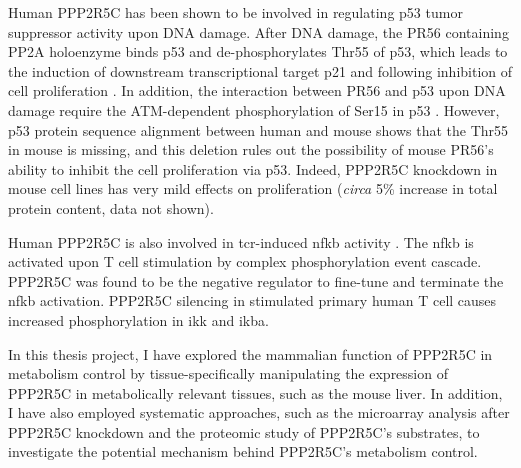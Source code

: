 Human PPP2R5C has been shown to be involved in regulating p53 tumor suppressor activity upon DNA damage\cite{li_specific_2007,shouse_serine_2008}. After DNA damage, the PR56\textgamma{} containing PP2A holoenzyme binds p53 and de-phosphorylates Thr55 of p53, which leads to the induction of downstream transcriptional target p21 and following inhibition of cell proliferation \cite{li_specific_2007}. In addition, the interaction between PR56\textgamma{} and p53 upon DNA damage require the ATM-dependent phosphorylation of Ser15 in p53 \cite{shouse_serine_2008}. However, p53 protein sequence alignment between human and mouse shows that the Thr55 in mouse is missing, and this deletion rules out the possibility of mouse PR56\textgamma{}'s ability to inhibit the cell proliferation via p53. Indeed, PPP2R5C knockdown in mouse cell lines has very mild effects on proliferation (\textit{circa} 5\% increase in total protein content, data not shown).

Human PPP2R5C is also involved in \gls{tcr}-induced \gls{nfkb} activity \cite{breuer_protein_2014}. The \gls{nfkb} is activated upon T cell stimulation by complex phosphorylation event cascade. PPP2R5C was found to be the negative regulator to fine-tune and terminate the \gls{nfkb} activation. PPP2R5C silencing in stimulated primary human T cell causes increased phosphorylation in \gls{ikk} and \gls{ikba}. 

In this thesis project, I have explored the mammalian function of PPP2R5C in metabolism control by tissue-specifically manipulating the expression of PPP2R5C in metabolically relevant tissues, such as the mouse liver. In addition, I have also employed systematic approaches, such as the microarray analysis after PPP2R5C knockdown and the proteomic study of PPP2R5C's substrates, to investigate the potential mechanism behind PPP2R5C's metabolism control. 


